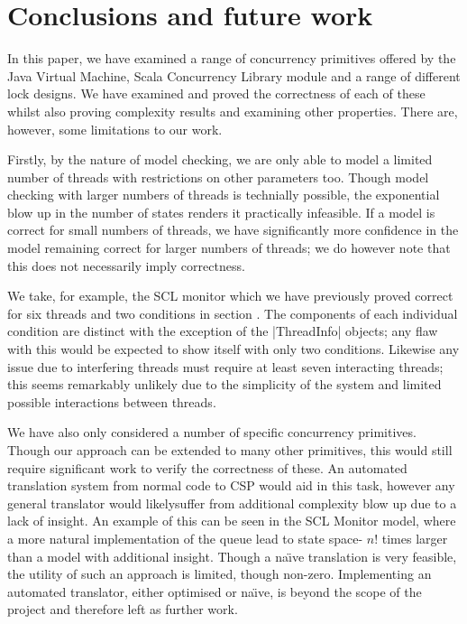\section{Conclusions and future work}

In this paper, we have examined a range of concurrency primitives offered by the Java Virtual Machine, Scala Concurrency Library module and a range of different lock designs. We have examined and proved the correctness of each of these whilst also proving complexity results and examining other properties. There are, however, some limitations to our work. 

Firstly, by the nature of model checking, we are only able to model a limited number of threads with restrictions on other parameters too. Though model checking with larger numbers of threads is technially possible, the exponential blow up in the number of states renders it practically infeasible. If a model is correct for small numbers of threads, we have significantly more confidence in the model remaining correct for larger numbers of threads; we do however note that this does not necessarily imply correctness. 

We take, for example, the SCL monitor which we have previously proved correct for six threads and two conditions in section . The components of each individual condition are distinct with the exception of the |ThreadInfo| objects; any flaw with this would be expected to show itself with only two conditions. Likewise any issue due to interfering threads must require at least seven interacting threads; this seems remarkably unlikely due to the simplicity of the system and limited possible interactions between threads. 

We have also only considered a number of specific concurrency primitives. Though our approach can be extended to many other primitives, this would still require significant work to verify the correctness of these. An automated translation system from normal code to CSP would aid in this task, however any general translator would likelysuffer from additional complexity blow up due to a lack of insight. An example of this can be seen in the SCL Monitor model, where a more natural implementation of the queue lead to state space- $n!$ times larger than a model with additional insight. Though a na\"{\i}ve translation is very feasible, the utility of such an approach is limited, though non-zero. Implementing an automated translator, either optimised or na\"{\i}ve, is beyond the scope of the project and therefore left as further work. 